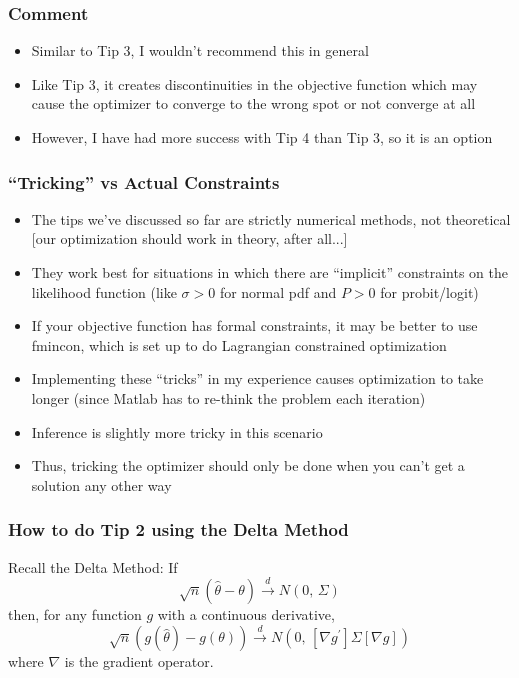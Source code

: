 \documentclass[english,xcolor=dvipsnames]{beamer}
\newcommand{\bi}{\begin{itemize}}
\newcommand{\ei}{\end{itemize}}
\begin{document}
\begin{frame}
\frametitle{Comment}

      \bi 
      \item Similar to Tip 3, I wouldn't recommend this in general
      \item Like Tip 3, it creates discontinuities in the objective function which may cause the optimizer to converge to the wrong spot or not converge at all
      \item However, I have had more success with Tip 4 than Tip 3, so it is an option
   \ei
\end{frame}

\begin{frame}
\frametitle{``Tricking'' vs Actual Constraints}

   \bi 
   \item The tips we've discussed so far are strictly numerical methods, not theoretical [our optimization should work in theory, after all...]
   \item They work best for situations in which there are ``implicit'' constraints on the likelihood function (like $\sigma>0$ for normal pdf and $P>0$ for probit/logit)
   \item If your objective function has formal constraints, it may be better to use fmincon, which is set up to do Lagrangian constrained optimization
   \item Implementing these ``tricks'' in my experience causes optimization to take longer (since Matlab has to re-think the problem each iteration)
   \item Inference is slightly more tricky in this scenario
   \item Thus, tricking the optimizer should only be done when you can't get a solution any other way
   \ei
\end{frame}

\begin{frame}
\frametitle{How to do Tip 2 using the Delta Method}
Recall the Delta Method:
If
\begin{equation}
	\sqrt{n}\left(\hat{\theta}-\theta\right)\overset{d}{\rightarrow}N\left(0,\,\Sigma\right)
\label{eq:1}
\end{equation}
then, for any function $g$ with a continuous derivative,
\begin{equation}
	\sqrt{n}\left(g(\hat{\theta})-g(\theta)\right)\overset{d}{\rightarrow}N\left(0,\,[\nabla g^\prime] \Sigma [\nabla g]\right)
\label{eq:2}
\end{equation}
where $\nabla$ is the gradient operator.
\end{frame}
\end{document}

